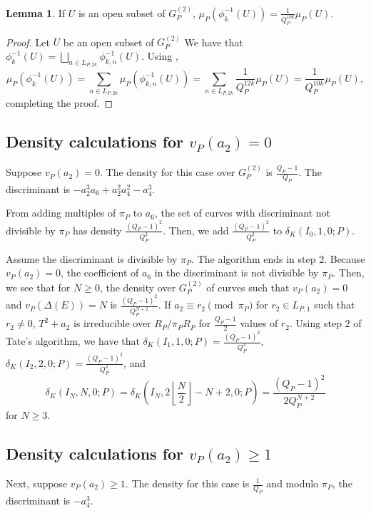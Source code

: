 \documentclass[12pt,letterpaper]{amsart}
\theoremstyle{definition}
\newtheorem{lemma}[theorem]{Lemma}
\begin{document}
\begin{lemma}
\label{invdensitymult2b}
If $U$ is an open subset of $G_P^{(2)}$, $\mu_P(\phi_k^{-1}(U))=\frac{1}{Q_P^{10k}}\mu_P(U)$.
\end{lemma}

\begin{proof}
Let $U$ be an open subset of $G_P^{(2)}$ We have that $\phi_k^{-1}(U)=\bigsqcup_{n\in L_{P, 2k}} \phi_{k,n}^{-1}(U)$. Using ,
\[
\mu_P(\phi_k^{-1}(U))=\sum_{n\in L_{P,2k}}\mu_P(\phi_{k,n}^{-1}(U))=\sum_{n\in L_{P,2k}} \frac{1}{Q_P^{12k}}\mu_P(U)= \frac{1}{Q_P^{10k}}\mu_P(U),
\]
completing the proof.
\end{proof}

\subsection{Density calculations for \texorpdfstring{$v_P(a_2)=0$}{}}

Suppose $v_P(a_2)=0$. The density for this case over $G_P^{(2)}$ is $\frac{Q_P-1}{Q_P}$. The discriminant is $-a_2^3a_6+a_2^2a_4^2-a_4^3$.

From adding multiples of $\pi_P$ to $a_6$, the set of curves with discriminant not divisible by $\pi_P$ has density $\frac{(Q_P-1)^2}{Q_P^2}$. Then, we add $\frac{(Q_P-1)^2}{Q_P^2}$ to $\delta_K(I_0,1,0;P)$.

Assume the discriminant is divisible by $\pi_P$. The algorithm ends in step 2. Because $v_P(a_2)=0$, the coefficient of $a_6$ in the discriminant is not divisible by $\pi_P$. Then, we see that for $N\geq 0$, the density over $G_P^{(2)}$ of curves such that $v_P(a_2)=0$ and $v_P(\Delta(E))=N$ is $\frac{(Q_P-1)^2}{Q_P^{N+2}}$. If $a_2\equiv r_2\pmod{\pi_P}$ for $r_2\in L_{P,1}$ such that $r_2\not=0$, $T^2+a_2$ is irreducible over $R_P/\pi_P R_P$ for $\frac{Q_P-1}{2}$ values of $r_2$. Using step 2 of Tate's algorithm, we have that $\delta_K(I_1, 1, 0; P)=\frac{(Q_P-1)^2}{Q_P^3}$, $\delta_K(I_2, 2, 0; P)=\frac{(Q_P-1)^2}{Q_P^4}$, and 
\[
\delta_K(I_N, N, 0;P)=\delta_K\left(I_N,2\left\lfloor\frac{N}{2}\right\rfloor-N+2,0;P\right)=\frac{(Q_P-1)^2}{2Q_P^{N+2}}
\]
for $N\geq 3$. 

\subsection{Density calculations for \texorpdfstring{$v_P(a_2)\geq 1$}{}}

Next, suppose $v_P(a_2)\geq 1$. The density for this case is $\frac{1}{Q_P}$ and modulo $\pi_P$, the discriminant is $-a_4^3$.
\end{document}
